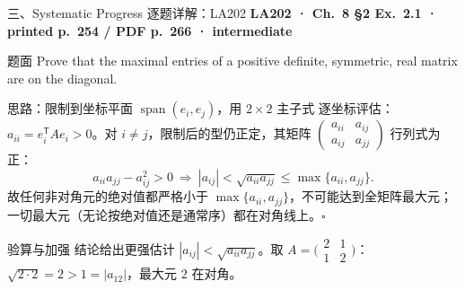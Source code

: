 \documentclass[aspectratio=169,10pt,fontset=none]{ctexbeamer}
\newcommand{\ex}[1]{\textcolor{accent}{\footnotesize\bfseries #1}}
\begin{document}
\begin{frame}[t]{三、Systematic Progress 逐题详解：LA202}
  \leavevmode\ex{LA202 · Ch.~8 §2 Ex.~2.1 · printed p.~254 / PDF p.~266 · intermediate}
  \begin{block}{\footnotesize 题面}
    \scriptsize Prove that the maximal entries of a positive definite, symmetric, real matrix are on the diagonal.
  \end{block}
  \begin{exampleblock}{\footnotesize 思路：限制到坐标平面 $\operatorname{span}(e_i,e_j)$，用 $2\times2$ 主子式}
    \scriptsize
    逐坐标评估：$a_{ii}=e_i^{\mathsf T}Ae_i>0$。对 $i\ne j$，限制后的型仍正定，其矩阵 $\begin{pmatrix}a_{ii}&a_{ij}\\a_{ij}&a_{jj}\end{pmatrix}$ 行列式为正：
    $$a_{ii}a_{jj}-a_{ij}^2>0\ \Longrightarrow\ |a_{ij}|<\sqrt{a_{ii}a_{jj}}\le\max\{a_{ii},a_{jj}\}.$$
    故任何非对角元的绝对值都严格小于 $\max\{a_{ii},a_{jj}\}$，不可能达到全矩阵最大元；一切最大元（无论按绝对值还是通常序）都在对角线上。$\square$
  \end{exampleblock}
  \begin{block}{\footnotesize 验算与加强}
    \scriptsize 结论给出更强估计 $|a_{ij}|<\sqrt{a_{ii}a_{jj}}$。取 $A=\bigl(\begin{smallmatrix}2&1\\1&2\end{smallmatrix}\bigr)$：$\sqrt{2\cdot2}=2>1=|a_{12}|$，最大元 $2$ 在对角。
  \end{block}
\end{frame}
\end{document}

